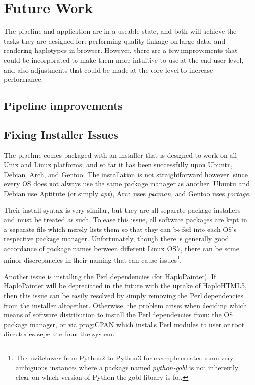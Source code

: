 \section{Future Work}

The pipeline and application are in a useable state, and both will achieve the tasks they are designed for: performing quality linkage on large data, and rendering haplotypes in-browser. However, there are a few improvements that could be incorporated to make them more intuitive to use at the end-user level, and also adjustments that could be made at the core level to increase performance.

\subsection{Pipeline improvements}

\subsection{Fixing Installer Issues}

The pipeline comes packaged with an installer that is designed to work on all Unix and Linux platforms; and so far it has been successfully upon Ubuntu, Debian, Arch, and Gentoo. The installation is not straightforward however, since every OS does not always use the same package manager as another. Ubuntu and Debian use Aptitute (or simply \textit{apt}), Arch uses \textit{pacman}, and Gentoo uses \textit{portage}.

Their install syntax is very similar, but they are all separate package installers and must be treated as such. To ease this issue, all software packages are kept in a separate file which merely lists them so that they can be fed into each OS's respective package manager. Unfortunately, though there is generally good accordance of package names between different Linux OS's, there can be some minor discrepancies in their naming that can cause issues\footnote{The switchover from Python2 to Python3 for example creates some very ambiguous instances where a package named \textit{python-gobl} is not inherently clear on which version of Python the gobl library is for.}. 

Another issue is installing the Perl dependencies (for HaploPainter). If HaploPainter will be depreciated in the future with the uptake of HaploHTML5, then this issue can be easily resolved by simply removing the Perl dependencies from the installer altogether. Otherwise, the problem arises when deciding which means of software distribution to install the Perl dependencies from: the OS package manager, or via \gls{prog:CPAN} \cite{cpan} which installs Perl modules to user or root directories seperate from the system.

